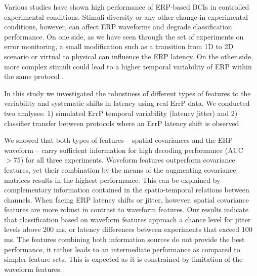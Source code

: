 \documentclass[12pt]{iopart}
\begin{document}
Various studies have shown high 
performance of ERP-based BCIs in controlled experimental conditions.
Stimuli diversity or any other change in experimental conditions, however,
can affect ERP waveforms and degrade classification performance.
On one side, as we have seen through the set of experiments on error monitoring,
a small modification such as a transition from 1D to 2D scenario
or virtual to physical can influence the ERP latency.
On the other side, more complex stimuli
could lead to a higher temporal variability of ERP within the same protocol  \cite{arico_evaluation_2013}.


In this study we investigated the robustness of different types of features
to the variability and systematic shifts in latency using real ErrP data.
We conducted two analyses: 1) simulated ErrP temporal variability (latency jitter)
and 2) classifier transfer between protocols where an ErrP latency shift is observed.

We showed that both types of features -- spatial covariances and the ERP waveform --
carry sufficient information for high decoding performance (AUC $> 75$) for all three experiments.
Waveform features outperform covariance features, yet their combination
by the means of the augmenting covariance matrices results
in the highest performance. This can be explained by complementary 
information contained in the spatio-temporal relations between channels.
When facing ERP latency shifts or jitter, however,
spatial covariance features are more robust in contrast to waveform features.
Our results indicate that classification based on waveform features approach a chance level
for jitter levels above 200 ms, or latency differences
between experiments that exceed 100 ms.
The features combining both information sources do not provide 
the best performance, it rather leads to an intermediate
performance as compared to simpler feature sets.
This is expected as it is constrained by limitation
of the waveform features. 
\end{document}

